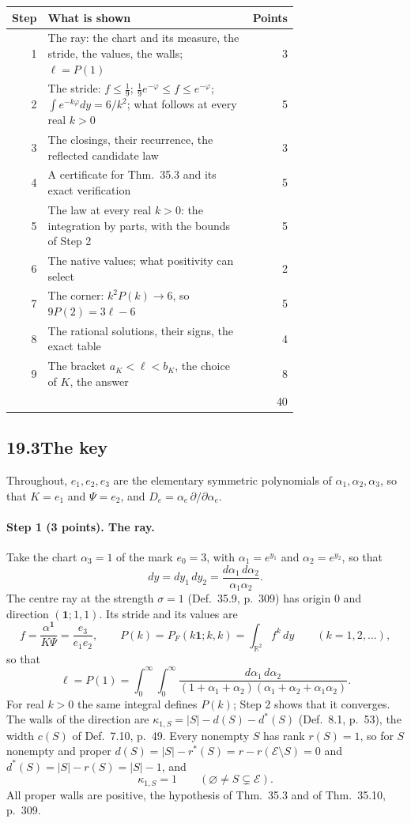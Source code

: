 \documentclass[11pt]{article}
\newcommand{\cE}{\mathcal E}
\newcommand{\one}{\mathbf 1}
\theoremstyle{plain}
\theoremstyle{definition}
\theoremstyle{remark}
\begin{document}
\begin{center}
\small
\begin{tabular}{@{}r p{0.72\linewidth} r@{}}
\toprule
Step & What is shown & Points\\ \midrule
1 & The ray: the chart and its measure, the stride, the values, the walls; $\ell=P(1)$ & 3\\
2 & The stride: $f\le\frac19$; $\frac19e^{-\varphi}\le f\le e^{-\varphi}$; $\int e^{-k\varphi}dy=6/k^2$; what follows at every real $k>0$ & 5\\
3 & The closings, their recurrence, the reflected candidate law & 3\\
4 & A certificate for Thm.~35.3 and its exact verification & 5\\
5 & The law at every real $k>0$: the integration by parts, with the bounds of Step 2 & 5\\
6 & The native values; what positivity can select & 2\\
7 & The corner: $k^2P(k)\to6$, so $9P(2)=3\ell-6$ & 5\\
8 & The rational solutions, their signs, the exact table & 4\\
9 & The bracket $a_K<\ell<b_K$, the choice of $K$, the answer & 8\\ \midrule
& & 40\\
\bottomrule
\end{tabular}
\end{center}

\subsection*{19.3\quad The key}

Throughout, $e_1,e_2,e_3$ are the elementary symmetric polynomials of $\alpha_1,\alpha_2,\alpha_3$, so that $K=e_1$ and $\Psi=e_2$, and $D_e=\alpha_e\,\partial/\partial\alpha_e$.

\paragraph{Step 1 (3 points). The ray.}
Take the chart $\alpha_3=1$ of the mark $e_0=3$, with $\alpha_1=e^{y_1}$ and $\alpha_2=e^{y_2}$, so that
\[
dy=dy_1\,dy_2=\frac{d\alpha_1\,d\alpha_2}{\alpha_1\alpha_2}.
\]
The centre ray at the strength $\sigma=1$ (Def.~35.9, p.~309) has origin $0$ and direction $(\one;1,1)$. Its stride and its values are
\[
f=\frac{\alpha^{\one}}{K\Psi}=\frac{e_3}{e_1e_2},\qquad P(k)=P_F(k\one;k,k)=\int_{\mathbb R^2}f^k\,dy\qquad(k=1,2,\dots),
\]
so that
\[
\ell=P(1)=\int_0^\infty\!\!\int_0^\infty\frac{d\alpha_1\,d\alpha_2}{(1+\alpha_1+\alpha_2)(\alpha_1+\alpha_2+\alpha_1\alpha_2)} .
\]
For real $k>0$ the same integral defines $P(k)$; Step 2 shows that it converges. The walls of the direction are $\kappa_{1,S}=|S|-d(S)-d^\ast(S)$ (Def.~8.1, p.~53), the width $c(S)$ of Def.~7.10, p.~49. Every nonempty $S$ has rank $r(S)=1$, so for $S$ nonempty and proper $d(S)=|S|-r^\ast(S)=r-r(\cE\setminus S)=0$ and $d^\ast(S)=|S|-r(S)=|S|-1$, and
\[
\kappa_{1,S}=1\qquad(\varnothing\neq S\subsetneq\cE).
\]
All proper walls are positive, the hypothesis of Thm.~35.3 and of Thm.~35.10, p.~309.
\end{document}
